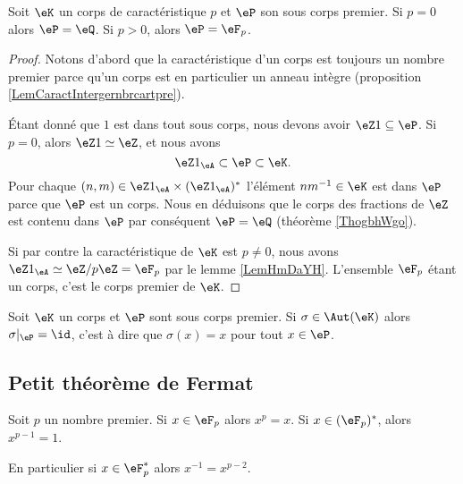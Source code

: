 \begin{proposition}
    Soit \( \eK\) un corps de caractéristique \( p\) et \( \eP\) son sous corps premier. Si \( p=0\) alors \( \eP=\eQ\). Si \( p>0\), alors \( \eP=\eF_p\).
\end{proposition}

\begin{proof}
    Notons d'abord que la caractéristique d'un corps est toujours un nombre premier parce qu'un corps est en particulier un anneau intègre (proposition \ref{LemCaractIntergernbrcartpre}).

    Étant donné que \( 1\) est dans tout sous corps, nous devons avoir \( \eZ 1\subseteq \eP\). Si \( p=0\), alors \( \eZ 1\simeq \eZ\), et nous avons
    \begin{equation}
        \eZ 1_{\eA}\subset \eP\subset \eK.
    \end{equation}
    Pour chaque \( (n,m)\in \eZ 1_{\eA}\times (\eZ 1_{\eA})^*\) l'élément \( nm^{-1}\in \eK\) est dans \( \eP\) parce que \( \eP\) est un corps. Nous en déduisons que le corps des fractions de \( \eZ\) est contenu dans \( \eP\) par conséquent \( \eP=\eQ\) (théorème \ref{ThogbhWgo}). 

    Si par contre la caractéristique de \( \eK\) est \( p\neq 0\), nous avons \( \eZ 1_{\eA}\simeq\eZ/p\eZ=\eF_p\) par le lemme \ref{LemHmDaYH}. L'ensemble \( \eF_p\) étant un corps, c'est le corps premier de \( \eK\).
\end{proof}

\begin{proposition}     \label{PropqPPrgJ}
    Soit \( \eK\) un corps et \( \eP\) sont sous corps premier. Si \( \sigma\in\Aut(\eK)\) alors \( \sigma|_{\eP}=\id\), c'est à dire que $\sigma(x)=x$ pour tout \( x\in \eP\).
\end{proposition}

\subsection{Petit théorème de Fermat}

\begin{theorem}       \label{ThoOPQOiO}   
    Soit \( p\) un nombre premier. Si \( x\in \eF_p\) alors \( x^p=x\). Si \( x\in(\eF_p)^*\), alors \( x^{p-1}=1\).

    En particulier si \( x\in \eF_p^*\) alors \( x^{-1}=x^{p-2}\).
\end{theorem}

